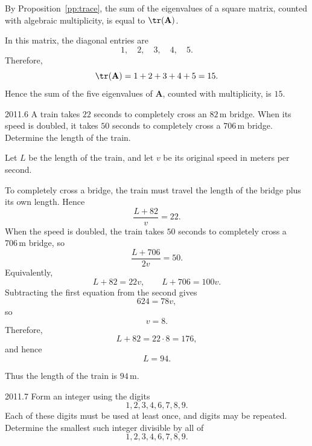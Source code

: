     \begin{solution}
        By Proposition~\ref{pp:trace}, the sum of the eigenvalues of a square matrix, counted with algebraic multiplicity, is equal
        to $\tr(\mathbf{A})$.

        In this matrix, the diagonal entries are
        \[
            1,\quad 2,\quad 3,\quad 4,\quad 5.
        \]
        Therefore,
        \[
            \tr(\mathbf{A})
            =
            1+2+3+4+5
            =
            15.
        \]
        Hence the sum of the five eigenvalues of $\mathbf{A}$, counted with multiplicity, is
        $\boxed{15}$.
    \end{solution}

    \begin{pastproblem}{2011.6}
        A train takes $22$ seconds to completely cross an $82\,\mathrm{m}$ bridge. When its speed is
        doubled, it takes $50$ seconds to completely cross a $706\,\mathrm{m}$ bridge. Determine the
        length of the train.
    \end{pastproblem}

    \begin{solution}
        Let $L$ be the length of the train, and let $v$ be its original speed in meters per second.

        To completely cross a bridge, the train must travel the length of the bridge plus its own
        length. Hence
        \[
            \frac{L+82}{v}=22.
        \]
        When the speed is doubled, the train takes $50$ seconds to completely cross a
        $706\,\mathrm{m}$ bridge, so
        \[
            \frac{L+706}{2v}=50.
        \]
        Equivalently,
        \[
            L+82=22v,
            \qquad
            L+706=100v.
        \]
        Subtracting the first equation from the second gives
        \[
            624=78v,
        \]
        so
        \[
            v=8.
        \]
        Therefore,
        \[
            L+82=22\cdot 8=176,
        \]
        and hence
        \[
            L=94.
        \]

        Thus the length of the train is $\boxed{94\,\mathrm{m}}$.
    \end{solution}

    \begin{pastproblem}{2011.7}
        Form an integer using the digits
        \[
            1,2,3,4,6,7,8,9.
        \]
        Each of these digits must be used at least once, and digits may be repeated. Determine the
        smallest such integer divisible by all of
        \[
            1,2,3,4,6,7,8,9.
        \]
    \end{pastproblem}


